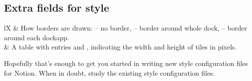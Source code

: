 \subsection{Extra fields for style }

\begin{tabularx}{\linewidth}{lX}
 & How borders are drawn:
			 -- no border,
			 -- border around whole dock,
			 -- border around each dockapp. \\
 & A table with entries  and ,
	indicating the width and height of tiles in pixels.
\end{tabularx}


Hopefully that's enough to get you started in writing new style
configuration files for Notion. When in doubt, study the existing
style configuration files.
